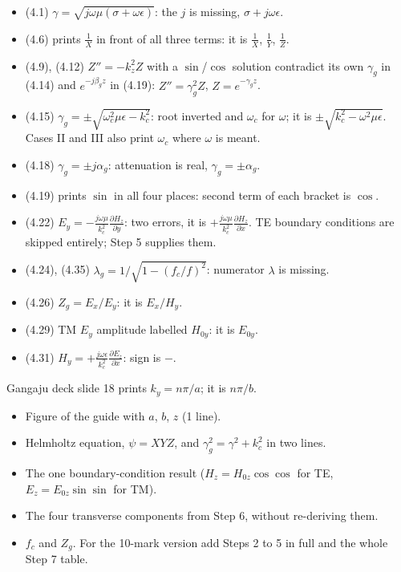 \par{}
{\footnotesize
\begin{itemize}
  \item (4.1) $\gamma = \sqrt{j\omega\mu(\sigma + \omega\epsilon)}$: the $j$ is missing,
    $\sigma + j\omega\epsilon$.
  \item (4.6) prints $\frac{1}{X}$ in front of all three terms: it is $\frac{1}{X}$,
    $\frac{1}{Y}$, $\frac{1}{Z}$.
  \item (4.9), (4.12) $Z'' = -k_z^2 Z$ with a $\sin$/$\cos$ solution contradict its own
    $\gamma_g$ in (4.14) and $e^{-j\beta_g z}$ in (4.19): $Z'' = \gamma_g^2 Z$, $Z = e^{-\gamma_g z}$.
  \item (4.15) $\gamma_g = \pm\sqrt{\omega_c^2\mu\epsilon - k_c^2}$: root inverted and $\omega_c$
    for $\omega$; it is $\pm\sqrt{k_c^2 - \omega^2\mu\epsilon}$. Cases II and III also print
    $\omega_c$ where $\omega$ is meant.
  \item (4.18) $\gamma_g = \pm j\alpha_g$: attenuation is real, $\gamma_g = \pm\alpha_g$.
  \item (4.19) prints $\sin$ in all four places: second term of each bracket is $\cos$.
  \item (4.22) $E_y = -\frac{j\omega\mu}{k_c^2}\frac{\partial H_z}{\partial y}$: two errors, it is
    $+\frac{j\omega\mu}{k_c^2}\frac{\partial H_z}{\partial x}$.
    TE boundary conditions are skipped entirely; Step 5 supplies them.
  \item (4.24), (4.35) $\lambda_g = 1/\sqrt{1 - (f_c/f)^2}$: numerator $\lambda$ is missing.
  \item (4.26) $Z_g = E_x/E_y$: it is $E_x/H_y$.
  \item (4.29) TM $E_y$ amplitude labelled $H_{0y}$: it is $E_{0y}$.
  \item (4.31) $H_y = +\frac{j\omega\epsilon}{k_c^2}\frac{\partial E_z}{\partial x}$: sign is $-$.
\end{itemize}}
{\color{sub}\footnotesize Gangaju deck slide 18 prints $k_y = n\pi/a$; it is $n\pi/b$.}

\par{}
\begin{itemize}
  \item Figure of the guide with $a$, $b$, $z$ (1 line).
  \item Helmholtz equation, $\psi = XYZ$, and $\gamma_g^2 = \gamma^2 + k_c^2$ in two lines.
  \item The one boundary-condition result ($H_z = H_{0z}\cos\cos$ for TE,
    $E_z = E_{0z}\sin\sin$ for TM).
  \item The four transverse components from Step 6, without re-deriving them.
  \item $f_c$ and $Z_g$. For the 10-mark version add Steps 2 to 5 in full and the whole
    Step 7 table.
\end{itemize}

